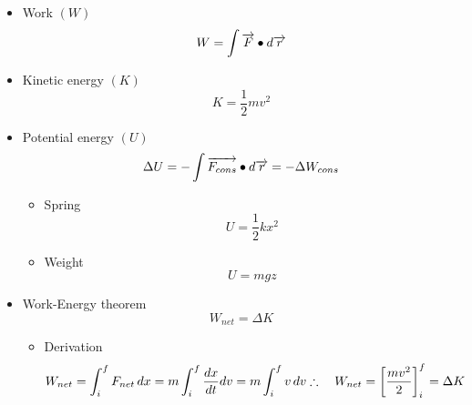         \begin{itemize}
            \item Work $(W)$
                \begin{equation}
                    W = \int \overrightarrow{F}\bullet d\overrightarrow{r}
                \end{equation}
            \item Kinetic energy $(K)$
                \begin{equation}
                    K=\frac{1}{2}mv^2
                \end{equation}
            \item Potential energy $(U)$
                \begin{equation}
                    \Delta U = - \int \overrightarrow{F_{cons}}\bullet d\overrightarrow{r} = - \Delta W_{cons}
                \end{equation}
                \begin{itemize}
                    \item Spring
                        \begin{equation}
                            U=\frac{1}{2}kx^2
                        \end{equation}
                    \item Weight
                        \begin{equation}
                            U=mgz
                        \end{equation}
                \end{itemize}
            \item Work-Energy theorem
                \begin{equation}
                    W_{net}=\Delta K
                \end{equation}
                \begin{itemize}
                    \item Derivation
                        \begin{equation}
                            W_{net} = \int_i^f F_{net} \, dx = m\int_i^f \dfrac{dx}{dt}dv = m\int_i^f v \, dv \\
                            \therefore \quad W_{net} = \left[\frac{mv^2}{2}\right]_i^f = \Delta K
                        \end{equation}
                \end{itemize}
        \end{itemize}
